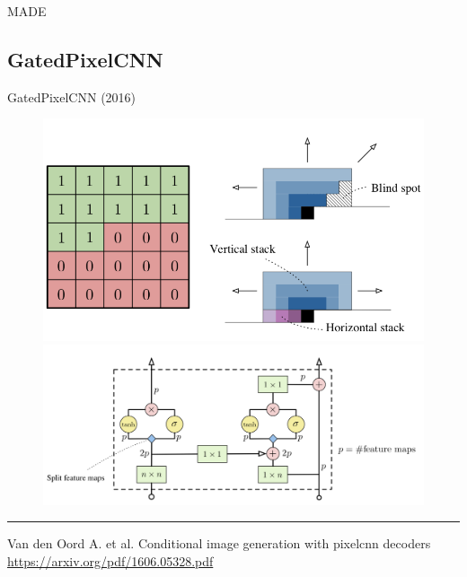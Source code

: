 \begin{frame}{MADE}
\begin{minipage}[t]{0.41\columnwidth}
\begin{figure}
		\end{figure}
	\end{minipage}
\end{frame}
\subsection{GatedPixelCNN}
\begin{frame}{GatedPixelCNN (2016)}
\begin{figure}
	\centering
	\includegraphics[width=0.5\linewidth]{figs/gatedpixelcnn.png}
	\includegraphics[width=0.5\linewidth]{figs/gated_block.png}
\end{figure}
\vfill
\hrule\medskip
{\scriptsize Van den Oord A. et al. Conditional image generation with pixelcnn decoders \href{https://arxiv.org/pdf/1606.05328.pdf}{https://arxiv.org/pdf/1606.05328.pdf}}
\end{frame}

